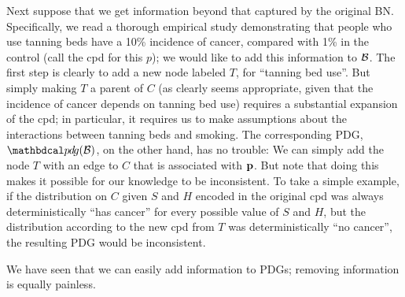 \documentclass{article}
\begin{document}
\begin{example}[emulating a BN]
Next suppose that we get information beyond that captured by the original BN.
Specifically, we read a thorough empirical study demonstrating that people who
use tanning beds have a 10\% incidence of cancer, compared with 1\% in the
control (call the cpd for this $p$); we would like to add this information to
$\cal B$. The first step is clearly to add a new node labeled $T$, for ``tanning
bed use''.  But simply making $T$ a parent of $C$ (as clearly seems appropriate,
given that the incidence of cancer depends on tanning bed use) requires a
substantial expansion of the cpd; in particular, it requires us to make
assumptions about the interactions between tanning beds and smoking.  
%
The corresponding PDG, $\PDGof{{\mathcal B}}$, on the other hand, has no
trouble: We can simply add the node $T$ with an edge to $C$ that is associated
with $\mathbf p$.  But note that doing this makes it possible for our knowledge to
be inconsistent. To take a simple example, if the distribution on $C$ given $S$
and $H$ encoded in the original cpd was always deterministically ``has cancer''
for every possible value of $S$ and $H$, but the distribution according to the
new cpd from $T$ was deterministically ``no cancer'', the resulting PDG would be
inconsistent.  
%
\end{example}


We have seen that we can easily add information to PDGs; removing information is
equally painless.   
\end{document}
